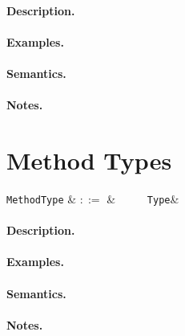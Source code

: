 \paragraph{Description.}  

\paragraph{Examples.}

\paragraph{Semantics.}

\paragraph{Notes.}


\section{Method Types}

\begin{syntax}
  \verb+MethodType+ & $::=$ & \ \token{(}\
  \ \token{)}\ \token{=>}\ \verb+Type+&\\
\end{syntax}

\paragraph{Description.}  

\paragraph{Examples.}

\paragraph{Semantics.}

\paragraph{Notes.}


